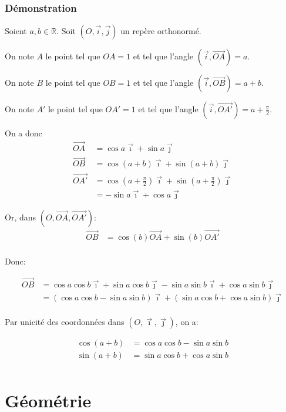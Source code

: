 \documentclass{article}
\newcommand{\R}{\mathbb{R}}
\newcommand{\vect}[1]{\overrightarrow{#1}}
\newcommand{\veci}{\vec\imath}
\newcommand{\vecj}{\vec\jmath}
\begin{document}
\subsubsection{Démonstration}
Soient $a, b \in \R$. Soit $(O, \vec i, \vec j)$ un repère orthonormé.

On note $A$ le point tel que $OA = 1$ et tel que l'angle $(\vec i, \vect{OA}) = a$. 

On note $B$ le point tel que $OB = 1$ et tel que l'angle $(\vec i, \vect{OB}) = a+b$. 

On note $A'$ le point tel que $OA' = 1$ et tel que l'angle $(\vec i, \vect{OA'}) = a + \frac{\pi}{2}$.


On a donc
\begin{align*}
	\vect{OA} &= \cos a \veci + \sin a \vecj \\
	\vect{OB} &= \cos (a+b) \veci + \sin (a+b) \vecj \\
	\vect{OA'} &= \cos (a+\frac{\pi}{2}) \veci + \sin (a+\frac{\pi}{2}) \vecj \\
			   &= -\sin a \veci + \cos a \vecj
\end{align*}

Or, dans $(O, \vect{OA}, \vect{OA'})$:
\begin{align*}
	\vect{OB} &= \cos (b) \vect{OA} + \sin (b) \vect{OA'} \\
\end{align*}

Donc:

\begin{align*}
	\vect{OB} &= \cos a \cos b \veci + \sin a \cos b \vecj - \sin a \sin b \veci + \cos a \sin b \vecj \\
			  &= (\cos a \cos b - \sin a \sin b)\veci + (\sin a \cos b + \cos a \sin b)\vecj \\
\end{align*}

Par unicité des coordonnées dans $(O, \veci, \vecj)$, on a:

\begin{align*}
	\cos(a+b)&= \cos a \cos b - \sin a \sin b \\
	\sin(a+b)&= \sin a \cos b + \cos a \sin b \\
\end{align*}

\newpage\section{Géométrie}
\end{document}
